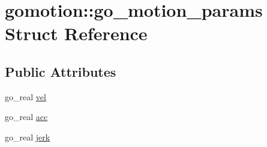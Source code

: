 \hypertarget{structgomotion_1_1go__motion__params}{\section{gomotion\-:\-:go\-\_\-motion\-\_\-params Struct Reference}
\label{structgomotion_1_1go__motion__params}
}
\subsection*{Public Attributes}
\begin{DoxyCompactItemize}
\item 
go\-\_\-real \hyperlink{structgomotion_1_1go__motion__params_ad3121c36c5257557895df5d036b22c9d}{vel}
\item 
go\-\_\-real \hyperlink{structgomotion_1_1go__motion__params_a494815c0bc4016f78b82e2005ee6ad70}{acc}
\item 
go\-\_\-real \hyperlink{structgomotion_1_1go__motion__params_a25db76d9565efdc899bc8bc28b4a7c32}{jerk}
\end{DoxyCompactItemize}



